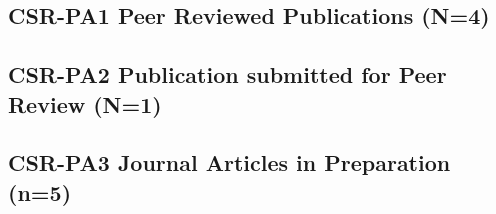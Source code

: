 \subsection{CSR-PA1 Peer Reviewed Publications (N=4)}
	\begin{refsection}
		\nocite{cave_biological_2022, mooreProposalDetectingCoconut2022,caasiMathematicalModelInvasion2023, mooreCoconutRhinocerosBeetle2023}
		\printbibliography[heading=none]	
	\end{refsection}

\subsection{CSR-PA2 Publication submitted for Peer Review (N=1)}
\begin{refsection}
	\nocite{paudelPheromone2023}
	\printbibliography[heading=none]	
\end{refsection}

\subsection{CSR-PA3 Journal Articles in Preparation (n=5)}
\begin{refsection}
	\nocite{moore_first_nodate-1,moore_mariana_2013,moore_three_nodate-1,moore_change_nodate,moore_coconut_nodate-1}	
	\printbibliography[heading=none]		
\end{refsection}

